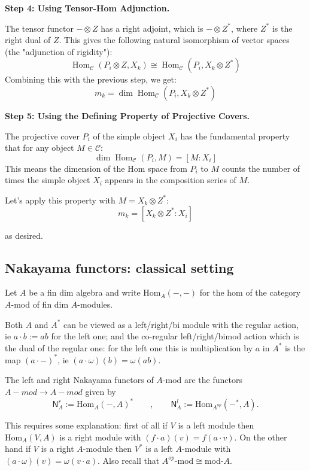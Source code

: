 \documentclass[11pt]{article}
\newcommand{\Hom}{\mathrm{Hom}}
\theoremstyle{definition}
\begin{document}
\textbf{Step 4: Using Tensor-Hom Adjunction.}

The tensor functor \( -\otimes Z \) has a right adjoint, which is \( -\otimes Z^* \), where \( Z^* \) is the right dual of \( Z \). This gives the following natural isomorphism of vector spaces (the "adjunction of rigidity"):
\[
\operatorname{Hom}_{\mathcal{C}}(P_i \otimes Z, X_k) \cong \operatorname{Hom}_{\mathcal{C}}(P_i, X_k \otimes Z^*)
\]
Combining this with the previous step, we get:
\[
m_k = \operatorname{dim} \operatorname{Hom}_{\mathcal{C}}(P_i, X_k \otimes Z^*)
\]

\textbf{Step 5: Using the Defining Property of Projective Covers.}

The projective cover \( P_i \) of the simple object \( X_i \) has the fundamental property that for any object \( M \in \mathcal{C} \):
\[
\operatorname{dim} \operatorname{Hom}_{\mathcal{C}}(P_i, M) = [M:X_i]
\]
This means the dimension of the Hom space from \( P_i \) to \( M \) counts the number of times the simple object \( X_i \) appears in the composition series of \( M \).

Let's apply this property with \( M = X_k \otimes Z^* \):
\[
m_k = [X_k \otimes Z^* : X_i]
\]

as desired.



\subsection{Nakayama functors: classical setting}


Let $A$ be a fin dim algebra and write $\Hom_A(-,-)$ for the hom of the category $A$-mod of fin dim $A$-modules.

Both $A$ and $A^*$ can be viewed as a left/right/bi module with the regular  action, ie $a \cdot b := ab$ for the left one; and the co-regular left/right/bimod action which is the dual of the regular one: for the left one this is multiplication by $a$ in $A^*$ is the map $(a \cdot -)^*$, ie $(a \cdot \omega)(b)= \omega (ab)$.


The left and right Nakayama functors of $A$-mod are the functors $A-mod \to A-mod$ given by $$\mathsf{N}^r_A :=\Hom_A(-,A)^* \qquad , \qquad \mathsf{N}^l_A:= \Hom_{A^{op}}(-^*,A).$$

This requires some explanation: first of all if $V$ is a left module then $\Hom_A(V,A)$ is a right module with $(f \cdot a)(v)= f(a\cdot v)$. On the other hand if $V$ is a right $A$-module then $V^*$ is a left $A$-module with $(a \cdot \omega)(v)=\omega (v \cdot a)$. Also recall that $A^{op}$-mod$ \cong $mod-$A$.
\end{document}
